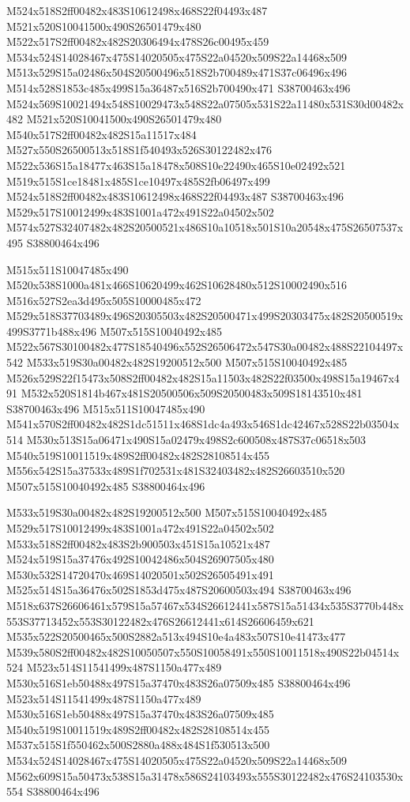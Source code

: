 \documentclass{article}
\begin{document}
\begin{multicols}{2}
M524x518S2ff00482x483S10612498x468S22f04493x487 M521x520S10041500x490S26501479x480 M522x517S2ff00482x482S20306494x478S26c00495x459 M534x524S14028467x475S14020505x475S22a04520x509S22a14468x509 M513x529S15a02486x504S20500496x518S2b700489x471S37c06496x496 M514x528S1853c485x499S15a36487x516S2b700490x471 S38700463x496 M524x569S10021494x548S10029473x548S22a07505x531S22a11480x531S30d00482x482 M521x520S10041500x490S26501479x480 M540x517S2ff00482x482S15a11517x484 M527x550S26500513x518S1f540493x526S30122482x476 M522x536S15a18477x463S15a18478x508S10e22490x465S10e02492x521 M519x515S1ce18481x485S1ce10497x485S2fb06497x499 M524x518S2ff00482x483S10612498x468S22f04493x487 S38700463x496 M529x517S10012499x483S1001a472x491S22a04502x502 M574x527S32407482x482S20500521x486S10a10518x501S10a20548x475S26507537x495 S38800464x496

M515x511S10047485x490 M520x538S1000a481x466S10620499x462S10628480x512S10002490x516 M516x527S2ea3d495x505S10000485x472 M529x518S37703489x496S20305503x482S20500471x499S20303475x482S20500519x499S3771b488x496 M507x515S10040492x485 M522x567S30100482x477S18540496x552S26506472x547S30a00482x488S22104497x542 M533x519S30a00482x482S19200512x500 M507x515S10040492x485 M526x529S22f15473x508S2ff00482x482S15a11503x482S22f03500x498S15a19467x491 M532x520S1814b467x481S20500506x509S20500483x509S18143510x481 S38700463x496 M515x511S10047485x490 M541x570S2ff00482x482S1dc51511x468S1dc4a493x546S1dc42467x528S22b03504x514 M530x513S15a06471x490S15a02479x498S2c600508x487S37c06518x503 M540x519S10011519x489S2ff00482x482S28108514x455 M556x542S15a37533x489S1f702531x481S32403482x482S26603510x520 M507x515S10040492x485 S38800464x496

M533x519S30a00482x482S19200512x500 M507x515S10040492x485 M529x517S10012499x483S1001a472x491S22a04502x502 M533x518S2ff00482x483S2b900503x451S15a10521x487 M524x519S15a37476x492S10042486x504S26907505x480 M530x532S14720470x469S14020501x502S26505491x491 M525x514S15a36476x502S1853d475x487S20600503x494 S38700463x496 M518x637S26606461x579S15a57467x534S26612441x587S15a51434x535S3770b448x553S37713452x553S30122482x476S26612441x614S26606459x621 M535x522S20500465x500S2882a513x494S10e4a483x507S10e41473x477 M539x580S2ff00482x482S10050507x550S10058491x550S10011518x490S22b04514x524 M523x514S11541499x487S1150a477x489 M530x516S1eb50488x497S15a37470x483S26a07509x485 S38800464x496 M523x514S11541499x487S1150a477x489 M530x516S1eb50488x497S15a37470x483S26a07509x485 M540x519S10011519x489S2ff00482x482S28108514x455 M537x515S1f550462x500S2880a488x484S1f530513x500 M534x524S14028467x475S14020505x475S22a04520x509S22a14468x509 M562x609S15a50473x538S15a31478x586S24103493x555S30122482x476S24103530x554 S38800464x496


\end{multicols}
\end{document}
